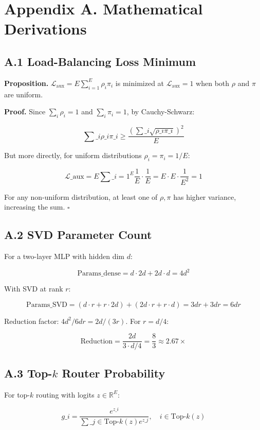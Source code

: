 \section{Appendix A. Mathematical Derivations}

\subsection{A.1 Load-Balancing Loss Minimum}

\textbf{Proposition.} $\mathcal{L}_\text{aux} = E \sum_{i=1}^{E} \rho_i \pi_i$ 
is minimized at $\mathcal{L}_\text{aux} = 1$ when both $\rho$ and $\pi$ are 
uniform.

\textbf{Proof.} Since $\sum_i \rho_i = 1$ and $\sum_i \pi_i = 1$, by Cauchy-Schwarz:

\[
\sum\_i \rho\_i \pi\_i \geq \frac{(\sum\_i \sqrt{\rho\_i \pi\_i})^2}{E}
\]

But more directly, for uniform distributions $\rho_i = \pi_i = 1/E$:

\[
\mathcal{L}\_\text{aux} = E \sum\_{i=1}^{E} \frac{1}{E} \cdot \frac{1}{E} = E \cdot E \cdot \frac{1}{E^2} = 1
\]

For any non-uniform distribution, at least one of $\rho, \pi$ has higher 
variance, increasing the sum. $\square$

\subsection{A.2 SVD Parameter Count}

For a two-layer MLP with hidden dim $d$:

\[
\text{Params}\_\text{dense} = d \cdot 2d + 2d \cdot d = 4d^2
\]

With SVD at rank $r$:

\[
\text{Params}\_\text{SVD} = (d \cdot r + r \cdot 2d) + (2d \cdot r + r \cdot d) = 3dr + 3dr = 6dr
\]

Reduction factor: $4d^2 / 6dr = 2d / (3r)$. For $r = d/4$:

\[
\text{Reduction} = \frac{2d}{3 \cdot d/4} = \frac{8}{3} \approx 2.67\times
\]

\subsection{A.3 Top-$k$ Router Probability}

For top-$k$ routing with logits $z \in \mathbb{R}^E$:

\[
g\_i = \frac{e^{z\_i}}{\sum\_{j \in \text{Top-}k(z)} e^{z\_j}}, \quad i \in \text{Top-}k(z)
\]

